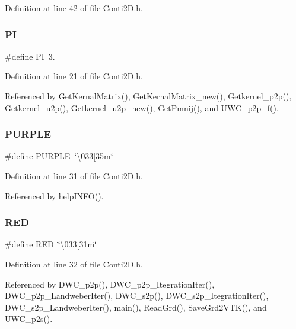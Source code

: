 Definition at line 42 of file Conti2\+D.\+h.

\mbox{\label{Conti2D_8h_a598a3330b3c21701223ee0ca14316eca_a598a3330b3c21701223ee0ca14316eca}} 
\subsubsection{PI}
{\footnotesize\ttfamily \#define PI~3.}



Definition at line 21 of file Conti2\+D.\+h.



Referenced by Get\+Kernal\+Matrix(), Get\+Kernal\+Matrix\+\_\+new(), Getkernel\+\_\+p2p(), Getkernel\+\_\+u2p(), Getkernel\+\_\+u2p\+\_\+new(), Get\+Pmnij(), and U\+W\+C\+\_\+p2p\+\_\+f().

\mbox{\label{Conti2D_8h_a0bb0b009e7a7390473ace4d98bd843c0_a0bb0b009e7a7390473ace4d98bd843c0}} 
\subsubsection{P\+U\+R\+P\+LE}
{\footnotesize\ttfamily \#define P\+U\+R\+P\+LE~\char`\"{}\textbackslash{}033[35m\char`\"{}}



Definition at line 31 of file Conti2\+D.\+h.



Referenced by help\+I\+N\+F\+O().

\mbox{\label{Conti2D_8h_a8d23feea868a983c8c2b661e1e16972f_a8d23feea868a983c8c2b661e1e16972f}} 
\subsubsection{R\+ED}
{\footnotesize\ttfamily \#define R\+ED~\char`\"{}\textbackslash{}033[31m\char`\"{}}



Definition at line 32 of file Conti2\+D.\+h.



Referenced by D\+W\+C\+\_\+p2p(), D\+W\+C\+\_\+p2p\+\_\+\+Itegration\+Iter(), D\+W\+C\+\_\+p2p\+\_\+\+Landweber\+Iter(), D\+W\+C\+\_\+s2p(), D\+W\+C\+\_\+s2p\+\_\+\+Itegration\+Iter(), D\+W\+C\+\_\+s2p\+\_\+\+Landweber\+Iter(), main(), Read\+Grd(), Save\+Grd2\+V\+T\+K(), and U\+W\+C\+\_\+p2s().

